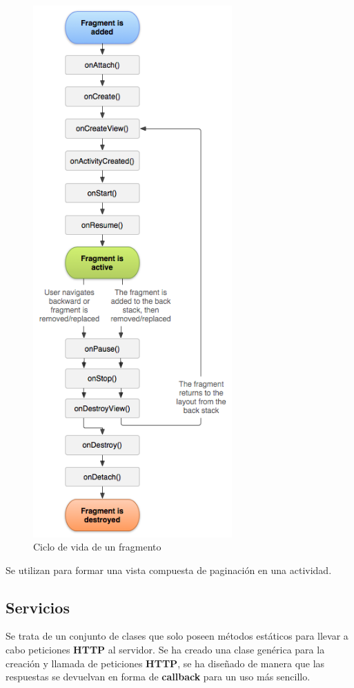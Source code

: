 \begin{figure}[H]
    \centering
    \includegraphics[width=3in]{figures/chapter-4/fragment_lifecycle.png}
    \caption{Ciclo de vida de un fragmento}
\end{figure}

Se utilizan para formar una vista compuesta de paginación en una actividad. 

\subsection{Servicios}
\label{makereference4.3.6}
Se trata de un conjunto de clases que solo poseen métodos estáticos para llevar a cabo peticiones \textbf{HTTP} al servidor. Se ha creado una clase genérica para la creación y llamada de peticiones \textbf{HTTP}, se ha diseñado de manera que las respuestas se devuelvan en forma de \textbf{callback} para un uso más sencillo.

